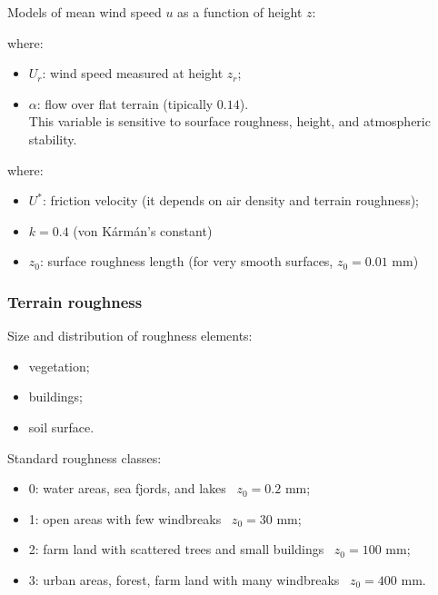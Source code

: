 \documentclass{article}
\newcommand{\tra}{\textrightarrow\ }
\begin{document}
Models of mean wind speed $u$ as a function of height $z$:

where:
\begin{itemize}
    \item $U_r$: wind speed measured at height $z_r$;
    \item $\alpha$: flow over flat terrain (tipically $0.14$).\\
        This variable is sensitive to sourface roughness, height, and atmospheric stability.
\end{itemize}


where:
\begin{itemize}
    \item $U^*$: friction velocity (it depends on air density and terrain roughness);
    \item $k = 0.4$ (von K\'arm\'an's constant)
    \item $z_0$: surface roughness length (for very smooth surfaces, $z_0 = 0.01$ mm)
\end{itemize}

\subsubsection{Terrain roughness}
Size and distribution of roughness elements:
\begin{itemize}
    \item vegetation;
    \item buildings;
    \item soil surface.
\end{itemize}

Standard roughness classes:
\begin{itemize}
    \item 0: water areas, sea fjords, and lakes \tra $z_0 = 0.2$ mm;
    \item 1: open areas with few windbreaks \tra $z_0 = 30$ mm;
    \item 2: farm land with scattered trees and small buildings \tra $z_0 = 100$ mm;
    \item 3: urban areas, forest, farm land with many windbreaks \tra $z_0 = 400$ mm.
\end{itemize}

\newpage
\end{document}
